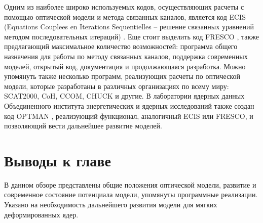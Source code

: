 Одним из наиболее широко используемых кодов, осуществляющих расчеты с помощью оптической модели и метода связанных каналов, является код ECIS (Equations Couplees en Iterations Sequentielles – решение связанных уравнений методом последовательных итераций) \cite{Raynal1994}. Еще стоит выделить код FRESCO \cite{Thompson1988}, также предлагающий максимальное количество возможностей: программа общего назначения для работы по методу связанных каналов, поддержка современных моделей, открытый код, документация и продолжающаяся разработка. Можно упомянуть также несколько программ, реализующих расчеты по оптической модели, которые разработаны в различных организациях по всему миру: SCAT2000, CoH, CCOM, CHUCK и другие. В лаборатории ядерных данных Объединенного института энергетических и ядерных исследований также создан код OPTMAN \cite{OPTMANmanual2005}, реализующий функционал, аналогичный ECIS или FRESCO, и позволяющий вести дальнейшее развитие моделей. 

\section{Выводы к главе}

В данном обзоре представлены общие положения оптической модели, развитие и современное состояние потенциала модели, упомянуты программные реализации. Указано на необходимость дальнейшего развития модели для мягких деформированных ядер.
